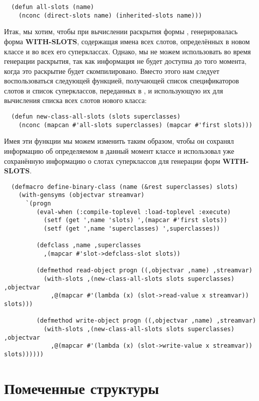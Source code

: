 \begin{lstlisting}
  (defun all-slots (name)
    (nconc (direct-slots name) (inherited-slots name)))
\end{lstlisting}

Итак, мы хотим, чтобы при вычислении раскрытия формы ,
генерировалась форма \textbf{WITH-SLOTS}, содержащая имена всех слотов, определённых в
новом классе и во всех его суперклассах. Однако, мы не можем использовать 
во время генерации раскрытия, так как информация не будет доступна до того момента, когда
это раскрытие будет скомпилировано. Вместо этого нам следует воспользоваться следующей
функцией, получающей список спецификаторов слотов и список суперклассов, переданных в
, и использующую их для вычисления списка всех слотов нового
класса:

\begin{lstlisting}
  (defun new-class-all-slots (slots superclasses)
    (nconc (mapcan #'all-slots superclasses) (mapcar #'first slots)))
\end{lstlisting}

Имея эти функции мы можем изменить  таким образом, чтобы он
сохранял информацию об определяемом в данный момент классе и использовал уже сохранённую
информацию о слотах суперклассов для генерации форм \textbf{WITH-SLOTS}.

\begin{lstlisting}
  (defmacro define-binary-class (name (&rest superclasses) slots)
    (with-gensyms (objectvar streamvar)
      `(progn
         (eval-when (:compile-toplevel :load-toplevel :execute)
           (setf (get ',name 'slots) ',(mapcar #'first slots))
           (setf (get ',name 'superclasses) ',superclasses))

         (defclass ,name ,superclasses
           ,(mapcar #'slot->defclass-slot slots))

         (defmethod read-object progn ((,objectvar ,name) ,streamvar)
           (with-slots ,(new-class-all-slots slots superclasses) ,objectvar
             ,@(mapcar #'(lambda (x) (slot->read-value x streamvar)) slots)))

         (defmethod write-object progn ((,objectvar ,name) ,streamvar)
           (with-slots ,(new-class-all-slots slots superclasses) ,objectvar
             ,@(mapcar #'(lambda (x) (slot->write-value x streamvar)) slots))))))
\end{lstlisting}

\section{Помеченные структуры}

